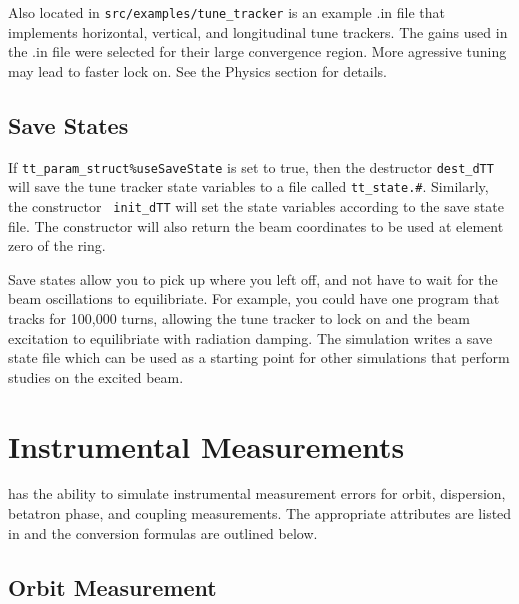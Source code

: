Also located in {\tt src/examples/tune\_tracker} is an example .in
file that implements horizontal, vertical, and longitudinal tune
trackers.  The gains used in the .in file were selected for their
large convergence region.  More agressive tuning may lead to faster
lock on.  See the Physics section for details.

\subsection{Save States}

If {\tt tt\_param\_struct\%useSaveState} is set to true, then the
destructor {\tt dest\_dTT} will save the tune tracker state variables
to a file called {\tt tt\_state.\#}.  Similarly, the constructor {\tt
init\_dTT} will set the state variables according to the save state
file.  The constructor will also return the beam coordinates to be
used at element zero of the ring.

Save states allow you to pick up where you left off, and not have to
wait for the beam oscillations to equilibriate.  For example, you
could have one program that tracks for 100,000 turns, allowing the
tune tracker to lock on and the beam excitation to equilibriate with
radiation damping.  The simulation writes a save state file which can
be used as a starting point for other simulations that perform studies
on the excited beam.

\section{Instrumental Measurements}
\label{s:meas.calc}

\bmad has the ability to simulate instrumental measurement errors
for orbit, dispersion, betatron phase, and coupling measurements.
The appropriate attributes are listed in  and
the conversion formulas are outlined below.

\subsection{Orbit Measurement}

